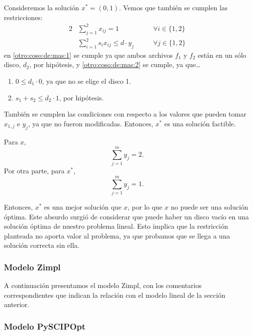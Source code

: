 \documentclass[11pt, a4paper, pdftex]{article}
\begin{document}
Consideremos la solución $x^{*} = (0, 1)$. Vemos que también se cumplen las
restricciones:
\begin{alignat}{2}
	& \sum_{j = 1}^{2} x_{ij} = 1                     &\qquad \forall i \in \{1, 2\}\label{otro:coso:de:mas:1}\\
	& \sum_{i = 1}^{2} s_{i} x_{ij} \le d \cdot y_{j} &\qquad \forall j \in \{1, 2\}\label{otro:coso:de:mas:2}
\end{alignat}
en \eqref{otro:coso:de:mas:1} se cumple ya que ambos archivos $f_{1}$ y
$f_{2}$ están en un sólo disco, $d_{2}$, por hipótesis, y
\eqref{otro:coso:de:mas:2} se cumple, ya que\ldots
\begin{enumerate}
	\item $0 \leq d_{1} \cdot 0$, ya que no se elige el disco 1.
	\item $s_{1} + s_{2} \leq d_{2} \cdot 1$, por hipótesis.
\end{enumerate}

También se cumplen las condiciones con respecto a los valores que pueden
tomar $x_{1, j}$ e $y_{j}$, ya que no fueron modificadas. Entonces,
$x^{*}$ es una solución factible.

Para $x$,
\begin{displaymath}
	\sum_{j = 1}^{m} y_{j} = 2.
\end{displaymath}
Por otra parte, para $x^{*}$,
\begin{displaymath}
	\sum_{j = 1}^{m} y_{j} = 1.
\end{displaymath}

Entonces, $x^{*}$ es una mejor solución que $x$, por lo que $x$ no puede
ser una solución óptima. Este absurdo surgió de considerar que puede
haber un disco vacío en una solución óptima de nuestro problema lineal.
Esto implica que la restricción planteada no aporta valor al problema,
ya que probamos que se llega a una solución correcta sin ella.

\newpage

\subsubsection{Modelo Zimpl}

A continuación presentamos el modelo Zimpl, con los comentarios
correspondientes que indican la relación con el modelo lineal de la sección
anterior.



\newpage
\subsubsection{Modelo PySCIPOpt}
\end{document}
